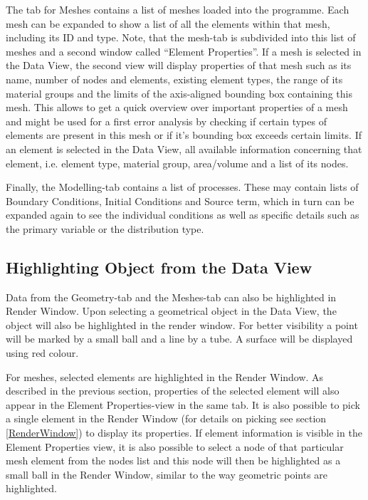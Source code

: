 The tab for Meshes contains a list of meshes loaded into the programme. Each mesh can be expanded to show a list of all the elements within that mesh, including its ID and type. Note, that the mesh-tab is subdivided into this list of meshes and a second window called ``Element Properties''. If a mesh is selected in the Data View, the second view will display properties of that mesh such as its name, number of nodes and elements, existing element types, the range of its material groups and the limits of the axis-aligned bounding box containing this mesh. This allows to get a quick overview over important properties of a mesh and might be used for a first error analysis by checking if certain types of elements are present in this mesh or if it's bounding box exceeds certain limits. If an element is selected in the Data View, all available information concerning that element, i.e. element type, material group, area/volume and a list of its nodes.

Finally, the Modelling-tab contains a list of processes. These may contain lists of Boundary Conditions, Initial Conditions and Source term, which in turn can be expanded again to see the individual conditions as well as specific details such as the primary variable or the distribution type.


\subsection{Highlighting Object from the Data View}

Data from the Geometry-tab and the Meshes-tab can also be highlighted in Render Window. Upon selecting a geometrical object in the Data View, the object will also be highlighted in the render window. For better visibility a point will be marked by a small ball and a line by a tube. A surface will be displayed using red colour.

For meshes, selected elements are highlighted in the Render Window. As described in the previous section, properties of the selected element will also appear in the Element Properties-view in the same tab. It is also possible to pick a single element in the Render Window (for details on picking see section \ref{RenderWindow}) to display its properties. If element information is visible in the Element Properties view, it is also possible to select a node of that particular mesh element from the nodes list and this node will then be highlighted as a small ball in the Render Window, similar to the way geometric points are highlighted.


